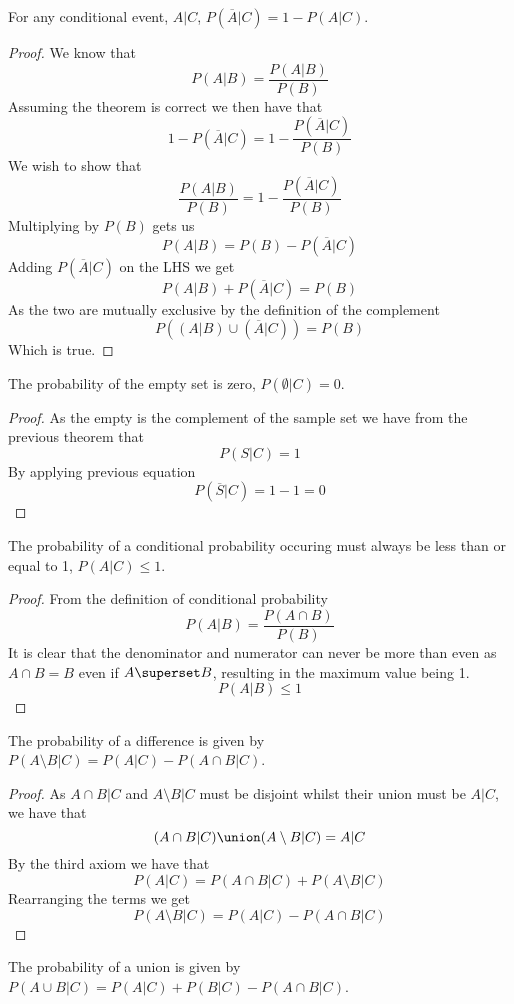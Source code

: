 \begin{theorem}
  For any conditional event, $A|C$, $P(\overline{A}|C)=1-P(A|C)$.
\end{theorem}
\begin{proof}
  We know that
  \[
      P(A|B)=\frac{P(A|B)}{P(B)}
  \]
  Assuming the theorem is correct we then have that
  \[
      1-P(\overline{A}|C)=1-\frac{P(\overline{A}|C)}{P(B)}
  \]
  We wish to show that
  \[
      \frac{P(A|B)}{P(B)}=1-\frac{P(\overline{A}|C)}{P(B)}
  \]
  Multiplying by $P(B)$ gets us
  \[
      P(A|B)=P(B)-P(\overline{A}|C)
  \]
  Adding $P(\overline{A}|C)$ on the LHS we get
  \[
      P(A|B)+P(\overline{A}|C)=P(B)
  \]
  As the two are mutually exclusive by the definition of the complement
  \[
      P((A|B)\cup (\overline{A}|C))=P(B)
  \]
  Which is true.
\end{proof}
\begin{theorem}
  The probability of the empty set is zero, $P(\emptyset|C)=0$.
\end{theorem}
\begin{proof}
  As the empty is the complement of the sample set we have from the previous theorem that
  \[
      P(S|C)=1
  \]
  By applying previous equation
  \[
      P(\overline{S}|C)=1-1=0
  \]
\end{proof}
\begin{theorem}
  The probability of a conditional probability occuring must always be less than or equal to 1, $P(A|C)\leq 1$.
\end{theorem}
\begin{proof}
  From the definition of conditional probability
  \[
      P(A|B)=\frac{P(A\cap B)}{P(B)}
  \]
  It is clear that the denominator and numerator can never be more than even as $A\cap B=B$ even if $A\superset B$, resulting in the maximum value being 1.
  \[
      P(A|B)\leq 1
  \]
\end{proof}
\begin{theorem}
  The probability of a difference is given by $P(A\setminus B|C)=P(A|C)-P(A\cap B|C)$.
\end{theorem}
\begin{proof}
  As $A\cap B|C$ and $A\setminus B|C$ must be disjoint whilst their union must be $A|C$, we have that
  \[
      (A\cap B|C)\union (A\setminus B|C)=A|C
  \]
  By the third axiom we have that
  \[
      P(A|C)=P(A\cap B|C)+P(A\setminus B|C)
  \]
  Rearranging the terms we get
  \[
      P(A\setminus B|C)=P(A|C)-P(A\cap B|C)
  \]
\end{proof}
\begin{theorem}
  The probability of a union is given by $P(A\cup B|C)=P(A|C)+P(B|C)-P(A\cap B|C)$.
\end{theorem}
